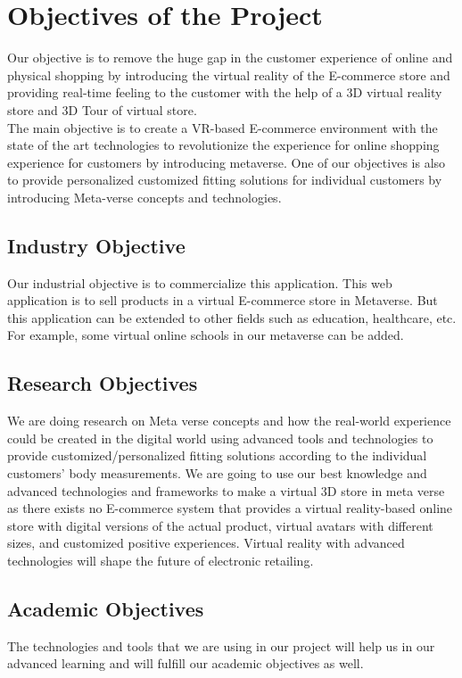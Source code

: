\section{Objectives of the Project}
\justifying
Our objective is to remove the huge gap in the customer experience of online and physical shopping by introducing the virtual reality of the E-commerce store and providing real-time feeling to the customer with the help of a 3D virtual reality store and 3D Tour of virtual store. \\
The main objective is to create a VR-based E-commerce environment with the state of the art technologies to revolutionize the experience for online shopping experience for customers by introducing metaverse. One of our objectives is also to provide personalized customized fitting solutions for individual customers by introducing Meta-verse concepts and technologies.
\subsection{Industry Objective}
\justifying
Our industrial objective is to commercialize this application. This web application is to sell products in a virtual E-commerce store in Metaverse. But this application can be extended to other fields such as education, healthcare, etc. For example, some virtual online schools in our metaverse can be added. 
\subsection{Research Objectives}
\justifying
We are doing research on Meta verse concepts and how the real-world experience could be created in the digital world using advanced tools and technologies to provide customized/personalized fitting solutions according to the individual customers' body measurements. We are going to use our best knowledge and advanced technologies and frameworks  to make a virtual 3D store in meta verse as there exists no E-commerce system that provides a virtual reality-based online store with digital versions of the actual product, virtual avatars with different sizes, and customized positive experiences. Virtual reality with advanced technologies will shape the future of electronic retailing.\cite{MARTINEZNAVARRO2019475}
\subsection{Academic Objectives}
\justifying
The technologies and tools that we are using in our project will help us in our advanced learning and will fulfill our academic objectives as well.
